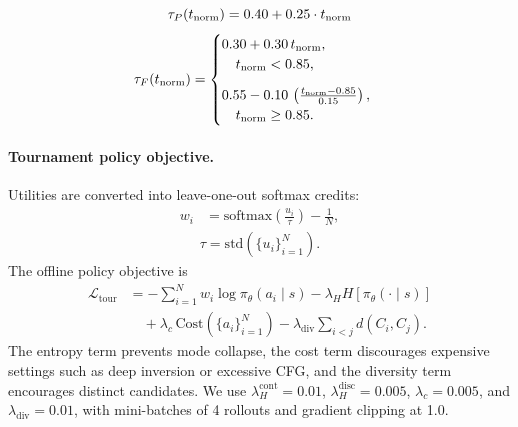 \documentclass[11pt]{article}
\begin{document}
\begin{equation}
\tau_P(t_{\text{norm}}) = 0.40 + 0.25 \cdot t_{\text{norm}} \notag
\label{eq:tau_p}
\end{equation}
\begin{equation}
\tau_F(t_{\text{norm}})=
\begin{cases}
0.30 + 0.30\, t_{\text{norm}}, \\
\quad t_{\text{norm}} < 0.85, \\[8pt]
0.55 - 0.10\,
\left(
\frac{t_{\text{norm}} - 0.85}{0.15}
\right), \\
\quad t_{\text{norm}} \geq 0.85.\notag
\end{cases}
\label{eq:tau_f2}
\end{equation}

\paragraph{Tournament policy objective.}
Utilities are converted into leave-one-out softmax credits:
\begin{align*}
w_i
&=
\mathrm{softmax}
\left(
\frac{u_i}{\tau}
\right)
-
\frac{1}{N},
\end{align*}
\begin{align*}
\tau=
\mathrm{std}\!\left(\{u_i\}_{i=1}^{N}\right).
\end{align*}
The offline policy objective is
\begin{align*}
\mathcal{L}_{\mathrm{tour}}
&=
-\sum_{i=1}^{N}
w_i\log\pi_\theta(a_i\mid s)
-
\lambda_H H[\pi_\theta(\cdot\mid s)]                                \\[-0.1em]
&\quad+
\lambda_c\,\mathrm{Cost}(\{a_i\}_{i=1}^{N})
-
\lambda_{\mathrm{div}}
\sum_{i<j}d(C_i,C_j).
\end{align*}
The entropy term prevents mode collapse, the cost term discourages expensive
settings such as deep inversion or excessive CFG, and the diversity term
encourages distinct candidates. We use
$\lambda_H^{\mathrm{cont}}=0.01$,
$\lambda_H^{\mathrm{disc}}=0.005$,
$\lambda_c=0.005$, and $\lambda_{\mathrm{div}}=0.01$, with mini-batches of
4 rollouts and gradient clipping at 1.0.
\iffalse
\end{document}
